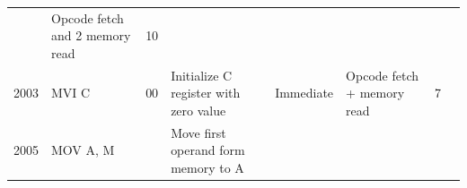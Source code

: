 \documentclass[11pt,twocolumn]{article}
\begin{document}
\begin{longtable}[]{@{}llllllll@{}}
\begin{minipage}[t]{0.09\columnwidth}
\end{minipage} & \begin{minipage}[t]{0.25\columnwidth}\raggedright
Opcode fetch and 2 memory read\strut
\end{minipage} & \begin{minipage}[t]{0.05\columnwidth}\raggedright
10\strut
\end{minipage} & \begin{minipage}[t]{0.03\columnwidth}\raggedright
\strut
\end{minipage}\tabularnewline
\begin{minipage}[t]{0.04\columnwidth}\raggedright
2003\strut
\end{minipage} & \begin{minipage}[t]{0.05\columnwidth}\raggedright
MVI C\strut
\end{minipage} & \begin{minipage}[t]{0.05\columnwidth}\raggedright
00\strut
\end{minipage} & \begin{minipage}[t]{0.23\columnwidth}\raggedright
Initialize C register with zero value\strut
\end{minipage} & \begin{minipage}[t]{0.09\columnwidth}\raggedright
Immediate\strut
\end{minipage} & \begin{minipage}[t]{0.25\columnwidth}\raggedright
Opcode fetch + memory read\strut
\end{minipage} & \begin{minipage}[t]{0.05\columnwidth}\raggedright
7\strut
\end{minipage} & \begin{minipage}[t]{0.03\columnwidth}\raggedright
\strut
\end{minipage}\tabularnewline
\begin{minipage}[t]{0.04\columnwidth}\raggedright
2005\strut
\end{minipage} & \begin{minipage}[t]{0.05\columnwidth}\raggedright
MOV A, M\strut
\end{minipage} & \begin{minipage}[t]{0.05\columnwidth}\raggedright
\strut
\end{minipage} & \begin{minipage}[t]{0.23\columnwidth}\raggedright
Move first operand form memory to A\strut
\end{minipage} & \begin{minipage}[t]{0.09\columnwidth}\raggedright

\end{minipage}
\end{longtable}
\end{document}
